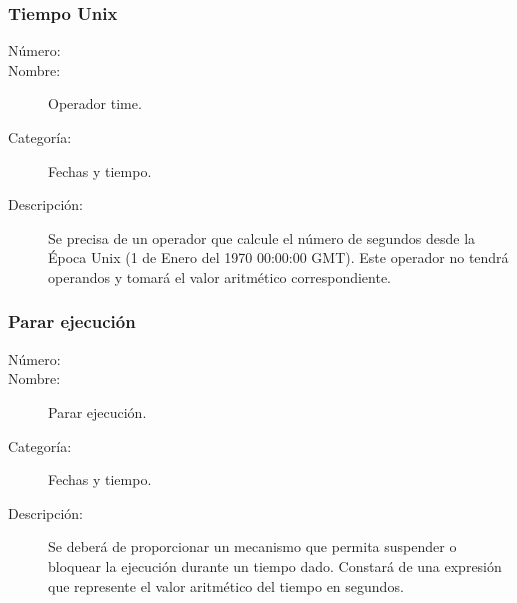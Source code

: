 \subsubsection{Tiempo Unix }
	\begin{description}
		\item [Número:] \cn
		\item [Nombre:] Operador time.
		\item [Categoría:] Fechas y tiempo.
		\item [Descripción:] Se precisa de un operador que calcule el número de segundos desde 
		la Época Unix (1 de Enero del 1970 00:00:00 GMT). Este operador no tendrá operandos y 
		tomará el valor aritmético correspondiente.		
	\end {description}

\subsubsection{Parar ejecución}
	\begin{description}
		\item [Número:] \cn
		\item [Nombre:] Parar ejecución.
		\item [Categoría:] Fechas y tiempo.
		\item [Descripción:] Se deberá de proporcionar un mecanismo que permita suspender o bloquear
		la ejecución durante un tiempo dado. Constará de una expresión que
		represente el valor aritmético del tiempo en segundos.
	\end{description}
